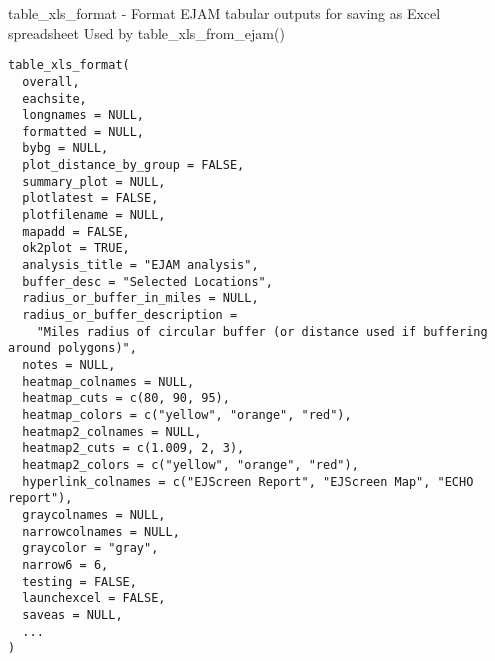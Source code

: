 \documentclass[a4paper]{book}
\begin{document}
%
\begin{Description}\relax
table\_xls\_format - Format EJAM tabular outputs for saving as Excel spreadsheet
Used by table\_xls\_from\_ejam()
\end{Description}
%
\begin{Usage}
\begin{verbatim}
table_xls_format(
  overall,
  eachsite,
  longnames = NULL,
  formatted = NULL,
  bybg = NULL,
  plot_distance_by_group = FALSE,
  summary_plot = NULL,
  plotlatest = FALSE,
  plotfilename = NULL,
  mapadd = FALSE,
  ok2plot = TRUE,
  analysis_title = "EJAM analysis",
  buffer_desc = "Selected Locations",
  radius_or_buffer_in_miles = NULL,
  radius_or_buffer_description =
    "Miles radius of circular buffer (or distance used if buffering around polygons)",
  notes = NULL,
  heatmap_colnames = NULL,
  heatmap_cuts = c(80, 90, 95),
  heatmap_colors = c("yellow", "orange", "red"),
  heatmap2_colnames = NULL,
  heatmap2_cuts = c(1.009, 2, 3),
  heatmap2_colors = c("yellow", "orange", "red"),
  hyperlink_colnames = c("EJScreen Report", "EJScreen Map", "ECHO report"),
  graycolnames = NULL,
  narrowcolnames = NULL,
  graycolor = "gray",
  narrow6 = 6,
  testing = FALSE,
  launchexcel = FALSE,
  saveas = NULL,
  ...
)
\end{verbatim}
\end{Usage}
%
\end{document}
